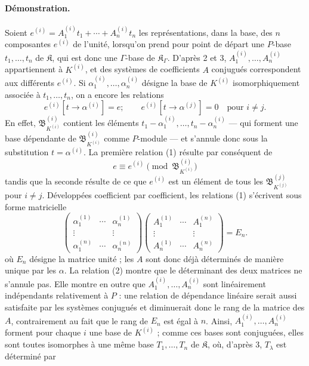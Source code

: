 \paragraph{Démonstration.}
Soient $e^{(i)}=A_1^{(i)}t_1+\cdots+A_n^{(i)}t_n$ les représentations, dans la base, des $n$ composantes $e^{(i)}$ de l'unité, lorsqu'on prend pour point de départ une $P$-base $t_1,\ldots,t_n$ de $\mathfrak K$, qui est donc une $\Gamma$-base de $\mathfrak K_\Gamma$. D'après 2 et 3, $A_1^{(i)},\ldots,A_n^{(i)}$ appartiennent à $K^{(i)}$, et des systèmes de coefficients $A$ conjugués correspondent aux différents $e^{(i)}$. Si $\alpha_1^{(i)},\ldots,\alpha_n^{(i)}$ désigne la base de $K^{(i)}$ isomorphiquement associée à $t_1,\ldots,t_n$, on a encore les relations
\begin{equation}
e^{(i)}[t\to\alpha^{(i)}]=e;
\qquad e^{(i)}[t\to\alpha^{(j)}]=0\quad\text{pour }i\ne j. \tag{1}
\end{equation}
En effet, $\mathfrak B_{K^{(i)}}^{(i)}$ contient les éléments $t_1-\alpha_1^{(i)},\ldots,t_n-\alpha_n^{(i)}$ --- qui forment une base dépendante de $\mathfrak B_{K^{(i)}}^{(i)}$ comme $P$-module --- et s'annule donc sous la substitution $t=\alpha^{(i)}$. La première relation (1) résulte par conséquent de
\[
e\equiv e^{(i)}\pmod{\mathfrak B_{K^{(i)}}^{(i)}}
\]
tandis que la seconde résulte de ce que $e^{(i)}$ est un élément de tous les $\mathfrak B_{K^{(j)}}^{(j)}$ pour $i\ne j$. Développées coefficient par coefficient, les relations (1) s'écrivent sous forme matricielle
\begin{equation}
\begin{pmatrix}
\alpha_1^{(1)}&\cdots&\alpha_n^{(1)}\\
\vdots&&\vdots\\
\alpha_1^{(n)}&\cdots&\alpha_n^{(n)}
\end{pmatrix}
\begin{pmatrix}
A_1^{(1)}&\cdots&A_1^{(n)}\\
\vdots&&\vdots\\
A_n^{(1)}&\cdots&A_n^{(n)}
\end{pmatrix}=E_n. \tag{2}
\end{equation}
où $E_n$ désigne la matrice unité ; les $A$ sont donc déjà déterminés de manière unique par les $\alpha$. La relation (2) montre que le déterminant des deux matrices ne s'annule pas. Elle montre en outre que $A_1^{(i)},\ldots,A_n^{(i)}$ sont linéairement indépendants relativement à $P$ : une relation de dépendance linéaire serait aussi satisfaite par les systèmes conjugués et diminuerait donc le rang de la matrice des $A$, contrairement au fait que le rang de $E_n$ est égal à $n$. Ainsi, $A_1^{(i)},\ldots,A_n^{(i)}$ forment pour chaque $i$ une base de $K^{(i)}$ ; comme ces bases sont conjuguées, elles sont toutes isomorphes à une même base $T_1,\ldots,T_n$ de $\mathfrak K$, où, d'après 3, $T_\lambda$ est déterminé par
